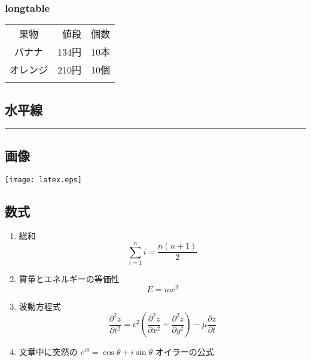 \subsubsection{longtable}
\begin{longtable}[c]{@{}crr@{}}
\toprule\addlinespace
果物 & 値段 & 個数
\\\addlinespace
\midrule\endhead
バナナ & 134円 & 10本
\\\addlinespace
オレンジ & 210円 & 10個
\\\addlinespace
\bottomrule
\end{longtable}

\subsection{水平線}
\begin{center}\rule{\textwidth}{.5pt}\end{center}

\subsection{画像}
\texttt{[image: latex.eps]}

\clearpage
\subsection{数式}
\begin{enumerate}

\item 総和
\begin{equation}
\sum_{i=1}^n i = \frac{n(n+1)}{2}
\end{equation}

\item 質量とエネルギーの等価性
\begin{equation}
E = mc ^2
\end{equation}

\item 波動方程式
\begin{equation}
\frac{\partial^2 z}{\partial t^2}=
c^2 (\frac{\partial^2 z}{\partial x^2}+\frac{\partial^2 z}{\partial y^2})-
\mu \frac{\partial z}{\partial t}
\end{equation}

\item 文章中に突然の $e^{i\theta}=\cos\theta+i\sin\theta$ オイラーの公式

\end{enumerate}
